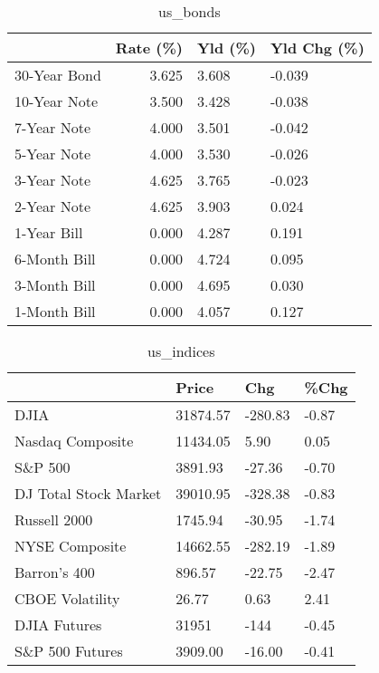 \documentclass{article}%
\begin{document}
%


\begin{table}[htbp]%
\caption{us\_bonds}%
\centering%
\begin{adjustbox}{width=1\textwidth}%
\begin{tabular}{lrll}
\toprule
             &  Rate (\%) & Yld (\%) & Yld Chg (\%) \\
\midrule
30-Year Bond &     3.625 &   3.608 &      -0.039 \\
10-Year Note &     3.500 &   3.428 &      -0.038 \\
 7-Year Note &     4.000 &   3.501 &      -0.042 \\
 5-Year Note &     4.000 &   3.530 &      -0.026 \\
 3-Year Note &     4.625 &   3.765 &      -0.023 \\
 2-Year Note &     4.625 &   3.903 &       0.024 \\
 1-Year Bill &     0.000 &   4.287 &       0.191 \\
6-Month Bill &     0.000 &   4.724 &       0.095 \\
3-Month Bill &     0.000 &   4.695 &       0.030 \\
1-Month Bill &     0.000 &   4.057 &       0.127 \\
\bottomrule
\end{tabular}
%
\end{adjustbox}%
\end{table}

%


\begin{table}[htbp]%
\caption{us\_indices}%
\centering%
\begin{adjustbox}{width=1\textwidth}%
\begin{tabular}{llll}
\toprule
                      &    Price &     Chg &  \%Chg \\
\midrule
                 DJIA & 31874.57 & -280.83 & -0.87 \\
     Nasdaq Composite & 11434.05 &    5.90 &  0.05 \\
              S\&P 500 &  3891.93 &  -27.36 & -0.70 \\
DJ Total Stock Market & 39010.95 & -328.38 & -0.83 \\
         Russell 2000 &  1745.94 &  -30.95 & -1.74 \\
       NYSE Composite & 14662.55 & -282.19 & -1.89 \\
         Barron's 400 &   896.57 &  -22.75 & -2.47 \\
      CBOE Volatility &    26.77 &    0.63 &  2.41 \\
         DJIA Futures &    31951 &    -144 & -0.45 \\
      S\&P 500 Futures &  3909.00 &  -16.00 & -0.41 \\
\bottomrule
\end{tabular}
%
\end{adjustbox}%
\end{table}
\end{document}
